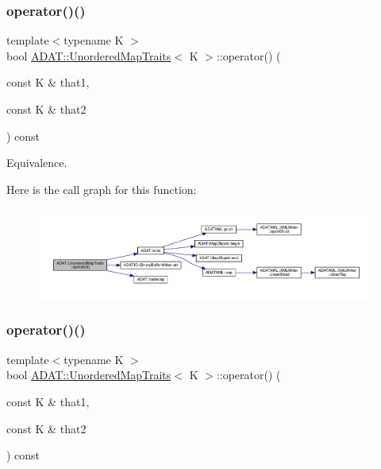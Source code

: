 \subsubsection{\texorpdfstring{operator()()}{operator()()}\hspace{0.1cm}{\footnotesize\ttfamily [5/6]}}
{\footnotesize\ttfamily template$<$typename K $>$ \\
bool \mbox{\hyperlink{structADAT_1_1UnorderedMapTraits}{A\+D\+A\+T\+::\+Unordered\+Map\+Traits}}$<$ K $>$\+::operator() (\begin{DoxyParamCaption}\item[{const K \&}]{that1,  }\item[{const K \&}]{that2 }\end{DoxyParamCaption}) const\hspace{0.3cm}{\ttfamily [inline]}}



Equivalence. 

Here is the call graph for this function\+:
\nopagebreak
\begin{figure}[H]
\begin{center}
\leavevmode
\includegraphics[width=350pt]{dd/d81/structADAT_1_1UnorderedMapTraits_a14c1daf5e4530fc4c749ec681103e7a2_cgraph}
\end{center}
\end{figure}
\mbox{\label{structADAT_1_1UnorderedMapTraits_a14c1daf5e4530fc4c749ec681103e7a2}} 
\subsubsection{\texorpdfstring{operator()()}{operator()()}\hspace{0.1cm}{\footnotesize\ttfamily [6/6]}}
{\footnotesize\ttfamily template$<$typename K $>$ \\
bool \mbox{\hyperlink{structADAT_1_1UnorderedMapTraits}{A\+D\+A\+T\+::\+Unordered\+Map\+Traits}}$<$ K $>$\+::operator() (\begin{DoxyParamCaption}\item[{const K \&}]{that1,  }\item[{const K \&}]{that2 }\end{DoxyParamCaption}) const\hspace{0.3cm}{\ttfamily [inline]}}



